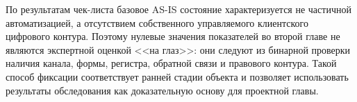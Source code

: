 По результатам чек-листа базовое AS-IS состояние характеризуется не частичной автоматизацией, а отсутствием собственного управляемого клиентского цифрового контура. Поэтому нулевые значения показателей во второй главе не являются экспертной оценкой <<на глаз>>: они следуют из бинарной проверки наличия канала, формы, регистра, обратной связи и правового контура. Такой способ фиксации соответствует ранней стадии объекта и позволяет использовать результаты обследования как доказательную основу для проектной главы.
